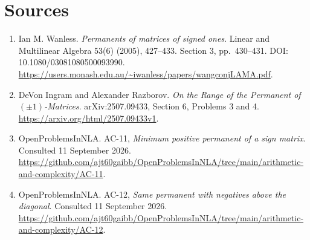 \documentclass[11pt,a4paper]{article}
\theoremstyle{remark}\newtheorem{remark}[theorem]{Remark}
\begin{document}
\section*{Sources}
\begingroup\footnotesize
\begin{enumerate}[label=\arabic*.,leftmargin=1.8em,itemsep=0.35em]
\item Ian M. Wanless. \emph{Permanents of matrices of signed ones}. Linear and Multilinear Algebra 53(6) (2005), 427--433. Section 3, pp.\ 430--431. DOI: 10.1080/03081080500093990. \url{https://users.monash.edu.au/~iwanless/papers/wangconjLAMA.pdf}.
\item DeVon Ingram and Alexander Razborov. \emph{On the Range of the Permanent of $(\pm1)$-Matrices}. arXiv:2507.09433, Section 6, Problems 3 and 4. \url{https://arxiv.org/html/2507.09433v1}.
\item OpenProblemsInNLA. AC-11, \emph{Minimum positive permanent of a sign matrix}. Consulted 11 September 2026. \url{https://github.com/ajt60gaibb/OpenProblemsInNLA/tree/main/arithmetic-and-complexity/AC-11}.
\item OpenProblemsInNLA. AC-12, \emph{Same permanent with negatives above the diagonal}. Consulted 11 September 2026. \url{https://github.com/ajt60gaibb/OpenProblemsInNLA/tree/main/arithmetic-and-complexity/AC-12}.
\end{enumerate}
\endgroup
\end{document}
